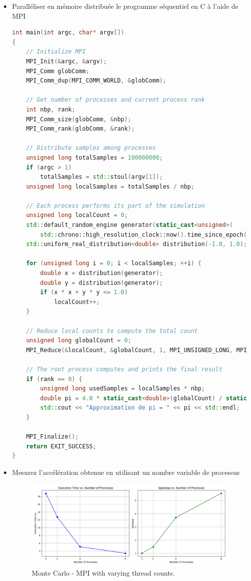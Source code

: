 \documentclass[11pt,a4paper]{article}
\begin{document}
\begin{itemize}
\item Paralléliser en mémoire distribuée le programme séquentiel en C à l'aide de MPI 

\begin{lstlisting}[language=C++, caption=Monte Carlo et MPI reduction]
int main(int argc, char* argv[])
{
    // Initialize MPI
    MPI_Init(&argc, &argv);
    MPI_Comm globComm;
    MPI_Comm_dup(MPI_COMM_WORLD, &globComm);

    // Get number of processes and current process rank
    int nbp, rank;
    MPI_Comm_size(globComm, &nbp);
    MPI_Comm_rank(globComm, &rank);

    // Distribute samples among processes
    unsigned long totalSamples = 100000000;
    if (argc > 1)
        totalSamples = std::stoul(argv[1]);
    unsigned long localSamples = totalSamples / nbp;

    // Each process performs its part of the simulation
    unsigned long localCount = 0;
    std::default_random_engine generator(static_cast<unsigned>(
        std::chrono::high_resolution_clock::now().time_since_epoch().count()) + rank);
    std::uniform_real_distribution<double> distribution(-1.0, 1.0);

    for (unsigned long i = 0; i < localSamples; ++i) {
        double x = distribution(generator);
        double y = distribution(generator);
        if (x * x + y * y <= 1.0)
            localCount++;
    }

    // Reduce local counts to compute the total count
    unsigned long globalCount = 0;
    MPI_Reduce(&localCount, &globalCount, 1, MPI_UNSIGNED_LONG, MPI_SUM, 0, globComm);

    // The root process computes and prints the final result
    if (rank == 0) {
        unsigned long usedSamples = localSamples * nbp;
        double pi = 4.0 * static_cast<double>(globalCount) / static_cast<double>(usedSamples);
        std::cout << "Approximation de pi = " << pi << std::endl;
    }

    MPI_Finalize();
    return EXIT_SUCCESS;
}
\end{lstlisting}

\item Mesurez l'accélération obtenue en utilisant un nombre variable de processus

\begin{figure}[H]
	\centering
	\includegraphics[width=\dimexpr\textwidth]{sources/calcul_pi/pi_MPI.png}
	\caption{Monte Carlo - MPI with varying thread counts.}
\end{figure}


\end{itemize}
\end{document}

